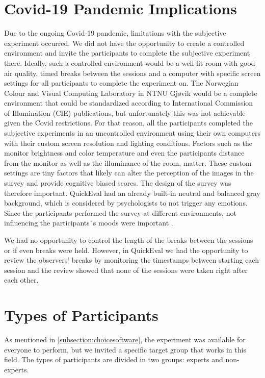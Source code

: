 \section{Covid-19 Pandemic Implications}
Due to the ongoing Covid-19 pandemic, limitations with the subjective experiment occurred. We did not have the opportunity to create a controlled environment and invite the participants to complete the subjective experiment there. Ideally, such a controlled environment would be a well-lit room with good air quality, timed breaks between the sessions and a computer with specific screen settings for all participants to complete the experiment on. The Norwegian Colour and Visual Computing Laboratory in NTNU Gjøvik would be a complete environment that could be standardized according to International Commission of Illumination (CIE) publications, but unfortunately this was not achievable given the Covid restrictions. For that reason, all the participants completed the subjective experiments in an uncontrolled environment using their own computers with their custom screen resolution and lighting conditions. Factors such as the monitor brightness and color temperature and even the participants distance from the monitor as well as the illuminance of the room, matter. These custom settings are tiny factors that likely can alter the perception of the images in the survey and provide cognitive biased scores. The design of the survey was therefore important. QuickEval had an already built-in neutral and balanced gray background, which is considered by psychologists to not trigger any emotions. Since the participants performed the survey at different environments, not influencing the participants´s moods were important \cite{grayBackground}. 

We had no opportunity to control the length of the breaks between the sessions or if even breaks were held. However, in QuickEval we had the opportunity to review the observers' breaks by monitoring the timestamps between starting each session and the review showed that none of the sessions were taken right after each other.  

\section{Types of Participants}
As mentioned in \ref{subsection:choicesoftware}, the experiment was available for everyone to perform, but we invited a specific target group that works in this field. The types of participants are divided in two groups: experts and non-experts.

